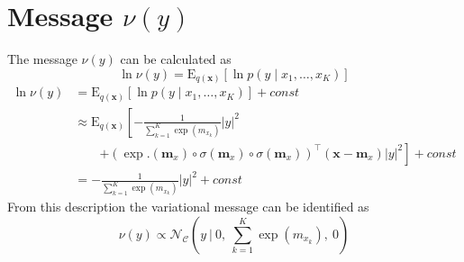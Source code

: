 \section{Message $\nu(y)$}

The message $\nu(y)$ can be calculated as
\begin{equation}
    \ln \nu(y) = \mathrm{E}_{q(\bm{x})}\left[\ln p(y\mid x_1, \ldots, x_K)\right]
\end{equation}
\begin{equation}
    \begin{split}
        \ln \nu(y) 
        &= \mathrm{E}_{q(\bm{x})}\left[\ln p(y\mid x_1, \ldots, x_K)\right] + \textit{const} \\
        &\approx \mathrm{E}_{q(\bm{x})}\left[-\frac{1}{\sum_{k=1}^K \exp(m_{x_k})}|y|^2 \right. \\
        &\qquad \left.+(\exp.(\bm{m}_x) \circ \sigma(\bm{m}_x) \circ \sigma(\bm{m}_x))^\top (\bm{x}-\bm{m}_x)|y|^2\right] + \textit{const} \\
        &= -\frac{1}{\sum_{k=1}^K \exp(m_{x_k})}|y|^2  +\textit{const}
    \end{split}
\end{equation}
From this description the variational message can be identified as   
\begin{equation}
    \boxed{
        \nu(y) \propto \mathcal{N}_\mathcal{C}\left(y \ \bigg\vert \ 0,\ \sum_{k=1}^K \exp \left( m_{x_k}\right) ,\ 0 \right)
    }
\end{equation}